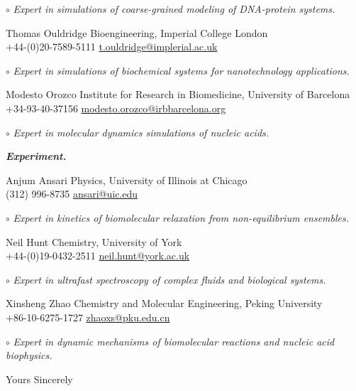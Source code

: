 \documentclass[11pt,a4paper]{letter} %
\begin{document}
\begin{letter}
$\circ$ \textit{Expert in simulations of coarse-grained modeling of DNA-protein systems.}

Thomas Ouldridge \hfill  Bioengineering, Imperial College London \\
+44-(0)20-7589-5111 \hfill \url{t.ouldridge@implerial.ac.uk}

$\circ$ \textit{Expert in simulations of biochemical systems for nanotechnology applications.}

Modesto Orozco \hfill  Institute for Research in Biomedicine, University of Barcelona \\
+34-93-40-37156 \hfill \url{modesto.orozco@irbbarcelona.org}

$\circ$ \textit{Expert in molecular dynamics simulations of nucleic acids.}

\textbf{\textit{Experiment.}}

Anjum Ansari \hfill Physics, University of Illinois at Chicago\\
(312) 996-8735 \hfill \url{ansari@uic.edu}

$\circ$ \textit{Expert in kinetics of biomolecular relaxation from non-equilibrium ensembles.}

Neil Hunt \hfill Chemistry, University of York \\
+44-(0)19-0432-2511 \hfill \url{neil.hunt@york.ac.uk}

$\circ$ \textit{Expert in ultrafast spectroscopy of complex fluids and biological systems.}

Xinsheng Zhao \hfill Chemistry and Molecular Engineering, Peking University \\
+86-10-6275-1727 \hfill \url{zhaoxs@pku.edu.cn}

$\circ$ \textit{Expert in dynamic mechanisms of biomolecular reactions and nucleic acid biophysics.}


\closing{Yours Sincerely}

\end{letter}




%
%
\end{document}
